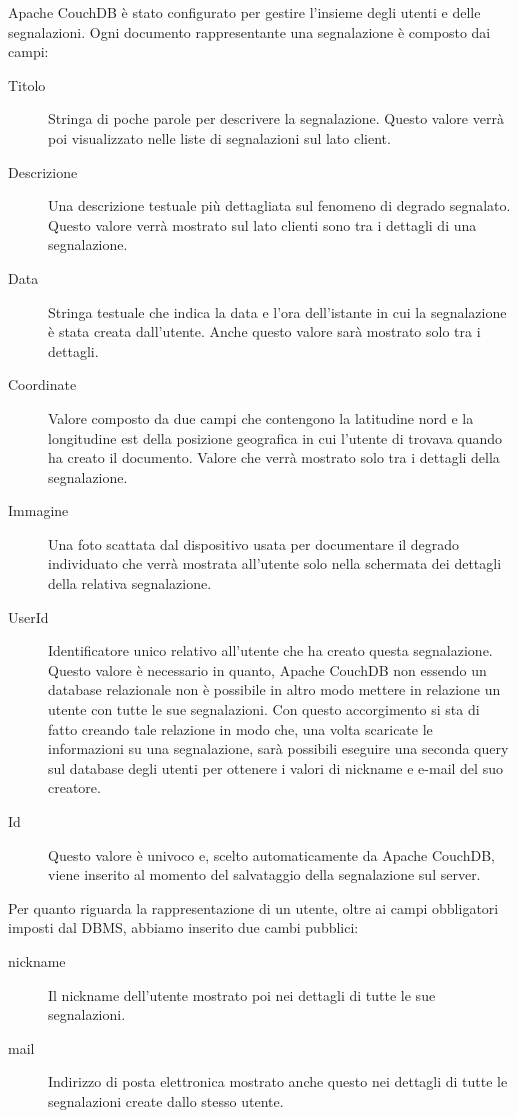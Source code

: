 		Apache CouchDB\texttrademark{} è stato configurato per gestire l'insieme
		degli utenti e delle segnalazioni. Ogni documento rappresentante una
		segnalazione è composto dai campi:
		\begin{description}
			\item[Titolo] Stringa di poche parole per descrivere la segnalazione.
				Questo valore verrà poi visualizzato nelle liste di segnalazioni
				sul lato client.
			\item[Descrizione] Una descrizione testuale più dettagliata sul
				fenomeno di degrado segnalato. Questo valore verrà mostrato sul
				lato clienti sono tra i dettagli di una segnalazione.
			\item[Data] Stringa testuale che indica la data e l'ora dell'istante
				in cui la segnalazione è stata creata dall'utente. Anche questo
				valore sarà mostrato solo tra i dettagli.
			\item[Coordinate] Valore composto da due campi che contengono la
				latitudine nord e la longitudine est della posizione geografica
				in cui l'utente di trovava quando ha creato il documento. Valore
				che verrà mostrato solo tra i dettagli della segnalazione.
			\item[Immagine] Una foto scattata dal dispositivo usata	per
				documentare il degrado individuato che verrà mostrata all'utente
				solo nella schermata dei dettagli della relativa segnalazione.
			\item[UserId] Identificatore unico relativo all'utente che ha creato
				questa segnalazione. Questo valore è necessario in quanto,
				Apache CouchDB\texttrademark{} non essendo un database relazionale
				non è possibile in altro modo mettere in relazione un utente con
				tutte le sue segnalazioni. Con questo accorgimento si sta di fatto
				creando tale relazione in modo che, una volta scaricate le
				informazioni su una segnalazione, sarà possibili eseguire una
				seconda query sul database degli utenti per ottenere i valori
				di nickname e e-mail del suo creatore.
			\item[Id] Questo valore è univoco e, scelto automaticamente da
				Apache CouchDB\texttrademark{}, viene inserito al momento del
				salvataggio della segnalazione sul server.
		\end{description}
		
		Per quanto riguarda la rappresentazione di un utente, oltre ai campi
		obbligatori imposti dal DBMS, abbiamo inserito due cambi pubblici:
		\begin{description}
			\item[nickname] Il nickname dell'utente mostrato poi nei dettagli
				di tutte le sue segnalazioni.
			\item[mail] Indirizzo di posta elettronica mostrato anche questo
				nei dettagli di tutte le segnalazioni create dallo stesso utente.
		\end{description}
		

